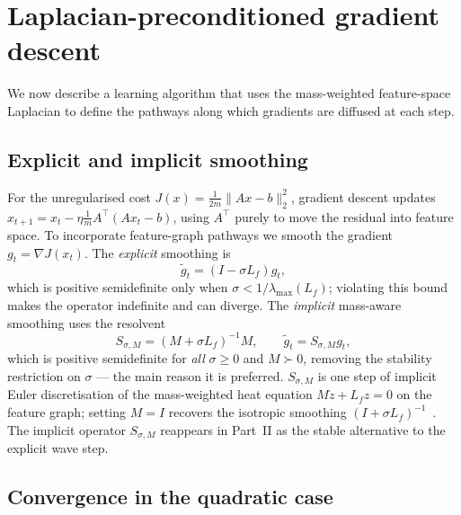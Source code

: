 \documentclass[12pt,a4paper]{article}
\theoremstyle{plain}
\theoremstyle{definition}
\theoremstyle{remark}
\newcommand{\1}{\mathbf{1}}
\begin{document}
\section{Laplacian-preconditioned gradient descent}
\label{sec:laplace_gd}

We now describe a learning algorithm that uses the mass-weighted
feature-space Laplacian to define the pathways along which gradients are
diffused at each step.

\subsection{Explicit and implicit smoothing}

For the unregularised cost $J(x) = \frac{1}{2m}\|Ax-b\|_2^2$, gradient
descent updates $x_{t+1} = x_t - \eta \frac{1}{m} A^\top (Ax_t - b)$,
using $A^\top$ purely to move the residual into feature space. To
incorporate feature-graph pathways we smooth the gradient
$g_t = \nabla J(x_t)$. The \emph{explicit} smoothing is
\begin{equation}
    \tilde g_t = (I - \sigma L_f) g_t,
    \label{eq:explicit_diffusion}
\end{equation}
which is positive semidefinite only when $\sigma < 1/\lambda_{\max}(L_f)$;
violating this bound makes the operator indefinite and can diverge. The
\emph{implicit} mass-aware smoothing uses the resolvent
\begin{equation}
    S_{\sigma,M} = (M + \sigma L_f)^{-1} M,
    \qquad
    \tilde g_t = S_{\sigma,M} g_t,
    \label{eq:implicit_diffusion}
\end{equation}
which is positive semidefinite for \emph{all} $\sigma \ge 0$ and
$M \succ 0$, removing the stability restriction on $\sigma$ --- the main
reason it is preferred. $S_{\sigma,M}$ is one step of implicit Euler
discretisation of the mass-weighted heat equation
$M \dot z + L_f z = 0$ on the feature graph; setting $M = I$ recovers the
isotropic smoothing $(I + \sigma L_f)^{-1}$~\cite{osher_lsgd_2022}. The
implicit operator $S_{\sigma,M}$ reappears in Part~II as the stable
alternative to the explicit wave step.

\subsection{Convergence in the quadratic case}
\label{subsec:convergence}
\end{document}
